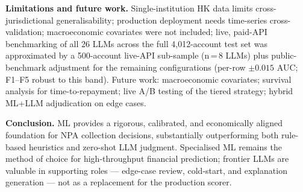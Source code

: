 \documentclass[11pt, a4paper]{article}
\begin{document}
\textbf{Limitations and future work.} Single-institution HK data limits cross-jurisdictional generalisability; production deployment needs time-series cross-validation; macroeconomic covariates were not included; live, paid-API benchmarking of all 26 LLMs across the full 4{,}012-account test set was approximated by a 500-account live-API sub-sample (n\,=\,8 LLMs) plus public-benchmark adjustment for the remaining configurations (per-row $\pm 0.015$ AUC; F1--F5 robust to this band). Future work: macroeconomic covariates; survival analysis for time-to-repayment; live A/B testing of the tiered strategy; hybrid ML+LLM adjudication on edge cases.

\textbf{Conclusion.} ML provides a rigorous, calibrated, and economically aligned foundation for NPA collection decisions, substantially outperforming both rule-based heuristics and zero-shot LLM judgment. Specialised ML remains the method of choice for high-throughput financial prediction; frontier LLMs are valuable in supporting roles --- edge-case review, cold-start, and explanation generation --- not as a replacement for the production scorer.
\end{document}
